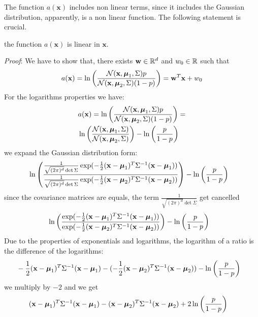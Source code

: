 \documentclass[10pt, letterpaper]{report}
\begin{document}
The function $a(\mathbf x)$ includes non linear terms, since it includes the Gaussian distribution, apparently, is a non linear function. The following statement is crucial.
\begin{theorem}
	the function $a(\mathbf x)$ is linear in $\mathbf x$.
\end{theorem}
\textit{Proof}: We have to show that, there exists $\mathbf w\in {\mathbb R}^d$ and $w_0\in {\mathbb R}$ such that\begin{equation}
	a(\mathbf x)=
	\ln\left(\frac{\mathcal N(\mathbf x,{\boldsymbol{\mu}}_1,\Sigma)p}{\mathcal N(\mathbf x,{\boldsymbol{\mu}}_2,\Sigma)(1-p)}\right)=\mathbf w^T\mathbf x+w_0
\end{equation}
For the logarithms properties we have:\begin{align}
	 & a(\mathbf x)=
	\ln\left(\frac{\mathcal N(\mathbf x,{\boldsymbol{\mu}}_1,\Sigma)p}{\mathcal N(\mathbf x,{\boldsymbol{\mu}}_2,\Sigma)(1-p)}\right)=                           \\
	 & \ln\left(\frac{\mathcal N(\mathbf x,{\boldsymbol{\mu}}_1,\Sigma)}{\mathcal N(\mathbf x,{\boldsymbol{\mu}}_2,\Sigma)}\right)-\ln\left(\frac{p}{1-p}\right)
\end{align}
we expand the Gaussian distribution form:\begin{align}
	 & \ln\left(\frac{ \frac{1}{\sqrt{(2\pi)^d}\det\Sigma}\exp(-\frac{1}{2}(\mathbf x-{\boldsymbol{\mu}}_1)^T\Sigma^{-1}(\mathbf x-{\boldsymbol{\mu}}_1))}{
		\frac{1}{\sqrt{(2\pi)^d}\det\Sigma}\exp(-\frac{1}{2}(\mathbf x-{\boldsymbol{\mu}}_2)^T\Sigma^{-1}(\mathbf x-{\boldsymbol{\mu}}_2))
	}\right)-\ln\left(\frac{p}{1-p}\right)
\end{align}
since the covariance matrices are equals, the term $\frac{1}{\sqrt{(2\pi)^d}\det\Sigma}$ get cancelled\begin{align}
	 & \ln\left(\frac{\exp(-\frac{1}{2}(\mathbf x-{\boldsymbol{\mu}}_1)^T\Sigma^{-1}(\mathbf x-{\boldsymbol{\mu}}_1))}{
			\exp(-\frac{1}{2}(\mathbf x-{\boldsymbol{\mu}}_2)^T\Sigma^{-1}(\mathbf x-{\boldsymbol{\mu}}_2))
		}\right)-\ln\left(\frac{p}{1-p}\right)
\end{align}
Due to the properties of exponentials and logarithms, the logarithm of a ratio is the difference of the logarithms:\begin{align}
	 & -\frac{1}{2}(\mathbf x-{\boldsymbol{\mu}}_1)^T\Sigma^{-1}(\mathbf x-{\boldsymbol{\mu}}_1)-
	(-\frac{1}{2}(\mathbf x-{\boldsymbol{\mu}}_2)^T\Sigma^{-1}(\mathbf x-{\boldsymbol{\mu}}_2))
	-
	\ln\left(\frac{p}{1-p}\right)
\end{align}
we multiply by $-2$ and we get\begin{align}
	 & (\mathbf x-{\boldsymbol{\mu}}_1)^T\Sigma^{-1}(\mathbf x-{\boldsymbol{\mu}}_1)-
	(\mathbf x-{\boldsymbol{\mu}}_2)^T\Sigma^{-1}(\mathbf x-{\boldsymbol{\mu}}_2)
	+
	2\ln\left(\frac{p}{1-p}\right)
\end{align}
\end{document}
